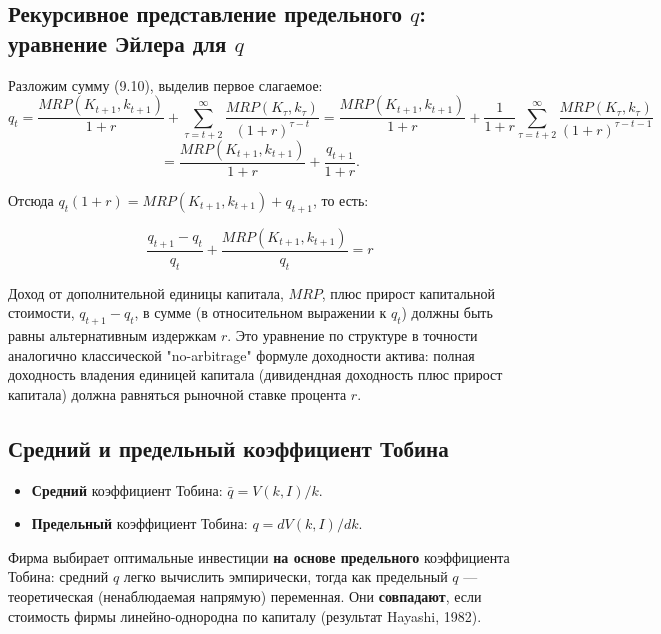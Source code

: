 \documentclass[10pt,a4paper]{article}
\begin{document}
\subsection{Рекурсивное представление предельного $q$: уравнение Эйлера для $q$}

Разложим сумму (9.10), выделив первое слагаемое:
$$q_t = \frac{MRP(K_{t+1},k_{t+1})}{1+r} + \sum_{\tau=t+2}^{\infty}\frac{MRP(K_\tau,k_\tau)}{(1+r)^{\tau-t}} = \frac{MRP(K_{t+1},k_{t+1})}{1+r} + \frac{1}{1+r}\sum_{\tau=t+2}^{\infty}\frac{MRP(K_\tau,k_\tau)}{(1+r)^{\tau-t-1}}$$
$$= \frac{MRP(K_{t+1},k_{t+1})}{1+r} + \frac{q_{t+1}}{1+r}.$$

Отсюда $q_t(1+r) = MRP(K_{t+1},k_{t+1}) + q_{t+1}$, то есть:
\begin{formulabox}
\begin{equation}
\frac{q_{t+1}-q_t}{q_t} + \frac{MRP(K_{t+1},k_{t+1})}{q_t} = r \tag{9.11}
\end{equation}
\end{formulabox}

\begin{intuition}
Доход от дополнительной единицы капитала, $MRP$, плюс прирост капитальной стоимости, $q_{t+1}-q_t$, в сумме (в относительном выражении к $q_t$) должны быть равны альтернативным издержкам $r$. Это уравнение по структуре в точности аналогично классической "no-arbitrage" формуле доходности актива: полная доходность владения единицей капитала (дивидендная доходность плюс прирост капитала) должна равняться рыночной ставке процента $r$.
\end{intuition}

\subsection{Средний и предельный коэффициент Тобина}

\begin{itemize}[leftmargin=1.3em]
\item \textbf{Средний} коэффициент Тобина: $\bar q = V(k,I)/k$.
\item \textbf{Предельный} коэффициент Тобина: $q = dV(k,I)/dk$.
\end{itemize}

Фирма выбирает оптимальные инвестиции \textbf{на основе предельного} коэффициента Тобина: средний $q$ легко вычислить эмпирически, тогда как предельный $q$ — теоретическая (ненаблюдаемая напрямую) переменная. Они \textbf{совпадают}, если стоимость фирмы линейно-однородна по капиталу (результат Hayashi, 1982).
\end{document}

